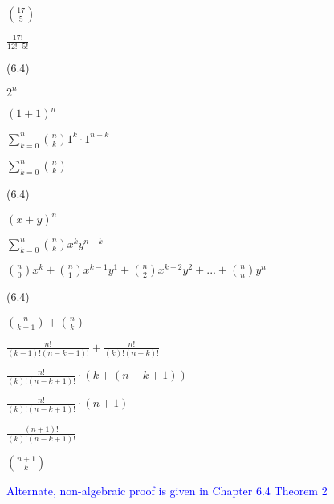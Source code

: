 \documentclass{exam}
\begin{document}
\begin{questions}
\begin{center}
\(17 \choose 5\)

\(\frac{17!}{12! \cdot 5!}\) 

\end{center}

 (6.4)

\begin{center}

\(2^n\)

\((1+1)^n\)

\(\sum_{k=0}^n {n \choose k} 1^k \cdot 1^{n-k}\)

\(\sum_{k=0}^n {n \choose k}\)

\end{center}

 (6.4)

\begin{center}
\( (x + y)^n \)

\(\sum_{k=0}^n {n \choose k} x^{k} y^{n-k}\)

\( {n \choose 0} x^k + {n \choose 1} x^{k-1}y^1 + {n \choose 2} x^{k-2}y^2 + ... + {n \choose n} y^n \)
\end{center}

 (6.4)

\begin{center}

\( { n \choose k-1 } + { n \choose k } \)

\( \frac{n!}{(k-1)!(n-k+1)!} + \frac{n!}{(k)!(n-k)!} \)

\( \frac{n!}{(k)!(n-k+1)!} \cdot (k + (n - k + 1)) \)

\( \frac{n!}{(k)!(n-k+1)!} \cdot (n + 1) \)

\( \frac{(n+1)!}{(k)!(n-k+1)!} \)

\( {n+1 \choose k} \)

\textcolor{blue}{Alternate, non-algebraic proof is given in Chapter 6.4 Theorem 2}

\end{center}





\end{questions}
\end{document}
